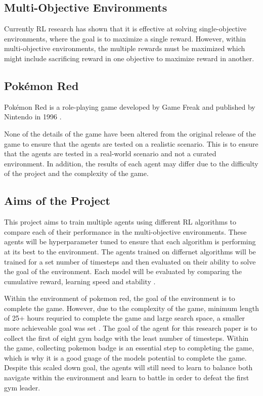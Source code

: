 \subsection{Multi-Objective Environments}
Currently RL research has shown that it is effective at solving single-objective environments, where the goal is to maximize a single reward. However, within multi-objective environments, the multiple rewards must be maximized which might include sacrificing reward in one objective to maximize reward in another.  

\subsection{Pokémon Red}
Pokémon Red is a role-playing game developed by Game Freak and published by Nintendo in 1996 \cite{HubZ_1998}. 

None of the details of the game have been altered from the original release of the game to ensure that the agents are tested on a realistic scenario. This is to ensure that the agents are tested in a real-world scenario and not a curated environment. In addition, the results of each agent may differ due to the difficulty of the project and the complexity of the game. 

\subsection{Aims of the Project}

This project aims to train multiple agents using different RL algorithms to compare each of their performance in the multi-objective environments. These agents will be hyperparameter tuned to ensure that each algorithm is performing at its best to the environment. The agents trained on differnet algorithms will be trained for a set number of timesteps and then evaluated on their ability to solve the goal of the environment. Each model will be evaluated by comparing the cumulative reward, learning speed and stability \cite{Sutton1}. 

Within the environment of pokemon red, the goal of the environment is to complete the game. However, due to the complexity of the game, minimum length of 25+ hours requried to complete the game and large search space, a smaller more achieveable goal was set \cite{howlongtobeat}. The goal of the agent for this research paper is to collect the first of eight gym badge with the least number of timesteps. Within the game, collecting pokemon badge is an essential step to completing the game, which is why it is a good guage of the models potential to complete the game. Despite this scaled down goal, the agents will still need to learn to balance both navigate within the environment and learn to battle in order to defeat the first gym leader.